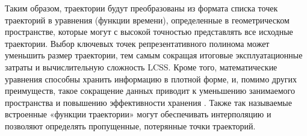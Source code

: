Таким образом, траектории будут преобразованы из формата списка точек траекторий в уравнения (функции времени), определенные в геометрическом пространстве, которые могут с высокой точностью представлять все исходные траектории. Выбор ключевых точек репрезентативного полинома может уменьшить размер траектории, тем самым сокращая итоговые эксплуатационные затраты и вычислительную сложность LCSS. Кроме того, математические уравнения способны хранить информацию в плотной форме, и, помимо других преимуществ, такое сокращение данных приводит к уменьшению занимаемого пространства и повышению эффективности хранения \cite{article:behav_form_extr}. Также так называемые встроенные «функции траектории» могут обеспечивать интерполяцию и позволяют определять пропущенные, потерянные точки траекторий.
